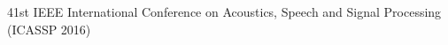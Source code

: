 
\colorbox{qmuldarkblue}
{
 \color{white}
 \parbox{1.0\textwidth}
 {
  \vspace{0.2cm}

  \begin{center}
  41st IEEE International Conference on Acoustics, Speech and Signal Processing (ICASSP 2016)
  \end{center}

  \vspace{0.2cm}
 }
}
